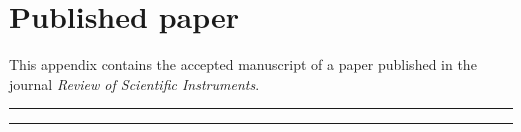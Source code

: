 
\chapter{Published paper} %
\label{AppendixB} %

This appendix contains the accepted manuscript of a paper published in the journal \textit{Review of Scientific Instruments}.

\hrule


\hrule


